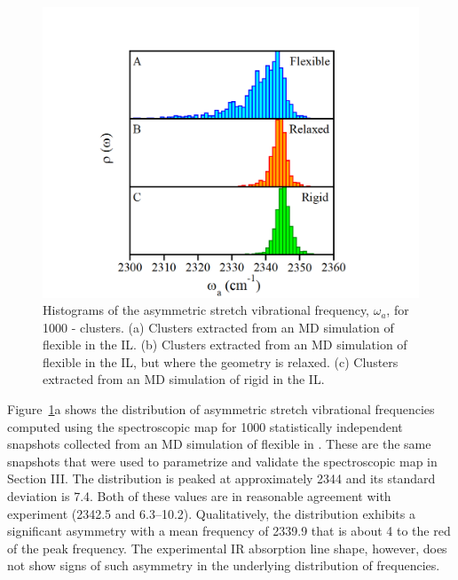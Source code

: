 \documentclass[%
  class = book,%
  crop = false,%
  float = true,%
  multi = true,%
  preview = false,%
]{standalone}
\begin{document}
\begin{figure}
  \centering
  \includegraphics[width=\textwidth]{figure5.png}
  \caption[Histograms of  \(\tilde{\nu}_{3}\) from MD simulations]{Histograms of the  asymmetric stretch vibrational frequency, \(\omega_{a}\), for \num{1000} -\ce{[C4C1im][PF6]} clusters. (a) Clusters extracted from an MD simulation of flexible  in the \ce{[C4C1im][PF6]} IL. (b) Clusters extracted from an MD simulation of flexible  in the \ce{[C4C1im][PF6]} IL, but where the  geometry is relaxed. (c) Clusters extracted from an MD simulation of rigid  in the \ce{[C4C1im][PF6]} IL.}
  \label{paper_03:fig5}
\end{figure}

Figure~\ref{paper_03:fig5}a shows the distribution of  asymmetric stretch vibrational frequencies computed using the spectroscopic map for 1000 statistically independent snapshots collected from an MD simulation of flexible  in \ce{[C4C1im][PF6]}. These are the same snapshots that were used to parametrize and validate the spectroscopic map in Section III. The distribution is peaked at approximately \SI{2344}{\wavenumber} and its standard deviation is \SI{7.4}{\wavenumber}. Both of these values are in reasonable agreement with experiment (\SI{2342.5}{\wavenumber} and \SIrange{6.3}{10.2}{\wavenumber}). Qualitatively, the distribution exhibits a significant asymmetry with a mean frequency of \SI{2339.9}{\wavenumber} that is about \SI{4}{\wavenumber} to the red of the peak frequency. The experimental IR absorption line shape, however, does not show signs of such asymmetry in the underlying distribution of frequencies.
\end{document}
